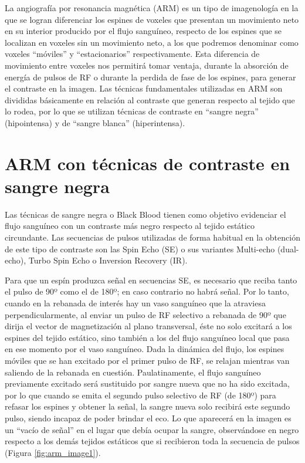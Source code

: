 La angiografía por resonancia magnética (ARM) es un tipo de imagenología en la que se logran diferenciar los espines de voxeles que presentan un movimiento neto en su interior producido por el flujo sanguíneo, respecto de los espines que se localizan en voxeles sin un movimiento neto, a los que podremos denominar como voxeles ``móviles'' y ``estacionarios'' respectivamente. Esta diferencia de movimiento entre voxeles nos permitirá tomar ventaja, durante la absorción de energía de pulsos de RF o durante la perdida de fase de los espines, para generar el contraste en la imagen. Las técnicas fundamentales utilizadas en ARM son divididas básicamente en relación al contraste que generan respecto al tejido que lo rodea, por lo que se utilizan técnicas de contraste en ``sangre negra'' (hipointensa) y de ``sangre blanca'' (hiperintensa).

\section{ARM con técnicas de contraste en sangre negra}
Las técnicas de sangre negra o Black Blood tienen como objetivo evidenciar el flujo sanguíneo con un contraste más negro respecto al tejido estático circundante. Las secuencias de pulsos utilizadas de forma habitual en la obtención de este tipo de contraste son las Spin Echo (SE) o sus variantes Multi-echo (dual-echo), Turbo Spin Echo o Inversion Recovery (IR). 

Para que un espín produzca señal en secuencias SE, es necesario que reciba tanto el pulso de 90º como el de 180º; en caso contrario no habrá señal. Por lo tanto, cuando en la rebanada de interés hay un vaso sanguíneo que la atraviesa perpendicularmente, al enviar un pulso de RF selectivo a rebanada de 90º que dirija el vector de magnetización al plano transversal, éste no solo excitará a los espines del tejido estático, sino también a los del flujo sanguíneo local que pasa en ese momento por el vaso sanguíneo. Dada la dinámica del flujo, los espines móviles que se han excitado por el primer pulso de RF, se relajan mientras van saliendo de la rebanada en cuestión. Paulatinamente, el flujo sanguíneo previamente excitado será sustituido por sangre nueva que no ha sido excitada, por lo que cuando se emita el segundo pulso selectivo de RF (de 180º) para refasar los espines y obtener la señal, la sangre nueva solo recibirá este segundo pulso, siendo incapaz de poder brindar el eco. Lo que aparecerá en la imagen es un ``vacío de señal'' en el lugar que debía ocupar la sangre, observándose en negro respecto a los demás tejidos estáticos que si recibieron toda la secuencia de pulsos (Figura \ref{fig:arm_image1}). 


